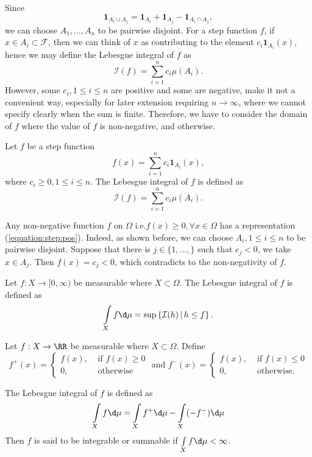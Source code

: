 Since
$$\mathbf{1}_{A_i\cup A_j} = \mathbf{1}_{A_i} + \mathbf{1}_{A_j} - \mathbf{1}_{A_i\cap A_j},$$
we can choose $A_1,\ldots,A_n$ to be pairwise disjoint. For a step function $f$, if $x\in A_i\subset\mathcal{F}$, then we can think of $x$ as contributing to the element $c_i\mathbf{1}_{A_i}(x)$, hence we may define the Lebesgue integral of $f$ as
$$\mathcal{I}(f)=\sum\limits_{i=1}^nc_i\mu(A_i).$$
However, some $c_i, 1\le i\le n$ are positive and some are negative, make it not a convenient way, especially for later extension requiring $n\to\infty$, where we cannot specify clearly when the sum is finite. Therefore, we have to consider the domain of $f$ where the value of $f$ is non-negative, and otherwise.

\begin{definition}
  Let $f$ be a step function
  \begin{equation}
    \label{equation:step:pos}
    f(x)=\sum\limits_{i=1}^nc_i\mathbf{1}_{A_i}(x),
  \end{equation}
  where $c_i\ge0, 1\le i\le n$. The Lebesgue integral of $f$ is defined as
  $$\mathcal{I}(f)=\sum\limits_{i=1}^nc_i\mu(A_i).$$
\end{definition}

Any non-negative function $f$ on $\Omega$ i.e.$f(x)\ge 0,\forall x\in\Omega$ has a representation (\ref{equation:step:pos}). Indeed, as shown before, we can choose $A_i, 1\le i\le n$ to be pairwise disjoint. Suppose that there is $j\in\{1,\ldots,\}$ such that $c_j<0$, we take $x\in A_j$. Then $f(x)=c_j<0$, which contradicts to the non-negativity of $f$.

\begin{definition}
  Let $f:X\to[0,\infty)$ be measurable where $X\subset\Omega$. The Lebesgue integral of $f$ is defined as
  \begin{equation}
    \int\limits_{X}f\d \mu = \sup\left\{\mathcal{I}(h)\,|\, h\le f\right\}.
  \end{equation}
\end{definition}

\begin{definition}
  Let $f:X\to\RR$ be measurable where $X\subset\Omega$. Define
  $$f^+(x)=\begin{cases}
      f(x), & \text{ if } f(x)\ge 0 \\
      0,    & \text{ otherwise}
    \end{cases} \text{ and } f^-(x)=\begin{cases}
      f(x), & \text{ if } f(x)\le 0 \\
      0,    & \text{ otherwise.}
    \end{cases}$$

  The Lebesgue integral of $f$ is defined as
  \begin{equation}
    \int\limits_{X}f\d \mu = \int\limits_{X}f^+\d \mu - \int\limits_{X}(-f^-)\d \mu
  \end{equation}
  Then $f$ is said to be integrable or summable if $\int\limits_{X}f\d \mu<\infty$.
\end{definition}

